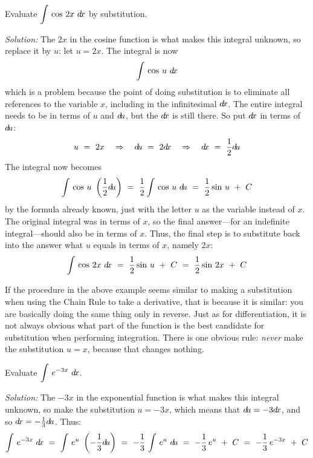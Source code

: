 \begin{exmp}\label{exmp:subst1}
\noindent Evaluate $\displaystyle\int\,\cos\,2x~d\!x$ by substitution.\vspace{1mm}
\par\noindent\emph{Solution:} The $2x$ in the cosine function is what makes this
integral unknown, so replace it by $u$: let $u = 2x$. The integral is now
\[
\int\,\cos\,u~d\!x
\]
which is a problem because the point of doing substitution is to eliminate all
references to the variable $x$, including in the infinitesimal $d\!x$. The entire
integral needs to be in terms of $u$ and $d\!u$, but the $d\!x$ is still there. So
put $d\!x$ in terms of $d\!u$:
\[
u ~=~ 2x \quad\Rightarrow\quad d\!u ~=~ 2 d\!x \quad\Rightarrow\quad d\!x ~=~
\frac{1}{2} d\!u
\]
The integral now becomes
\[
\int\,\cos\,u~ \left(\frac{1}{2}d\!u\right) ~=~
\frac{1}{2} \int\,\cos\,u~d\!u ~=~ \frac{1}{2} \sin\,u ~+~ C
\]
by the formula already known, just with the letter $u$ as the variable instead
of $x$. The original integral was in terms of $x$, so the final answer---for
an indefinite integral---should also be in terms of $x$. Thus, the final step is
to substitute back into the answer what $u$ equals in terms of $x$, namely $2x$:
\[
\int\,\cos\,2x~d\!x ~=~ \frac{1}{2} \sin\,u ~+~ C ~=~ \frac{1}{2} \sin\,2x ~+~ C
\]
\end{exmp}
\divider
\vspace{3mm}

If the procedure in the above example seems similar to making a substitution
when using the Chain Rule to take a derivative, that is because it is similar:
you are basically doing the same thing only in reverse. Just as for
differentiation, it is not always obvious what part of the function is the best
candidate for substitution when performing integration. There is one obvious
rule: \emph{never} make the substitution $u = x$, because that changes nothing.
\newpage
\begin{exmp}\label{exmp:subst2}
\noindent Evaluate $\displaystyle\int\,e^{-3x}~d\!x$.\vspace{1mm}
\par\noindent\emph{Solution:} The $-3x$ in the exponential function is what makes
this integral unknown, so make the substitution $u = -3x$, which means that
$d\!u = -3d\!x$, and so $d\!x = -\frac{1}{3}d\!u$. Thus:
\[
\int\,e^{-3x}~d\!x ~=~ \int\,e^{u}~\left(-\frac{1}{3}d\!u\right)
 ~=~ -\frac{1}{3}\,\int\,e^{u}~d\!u ~=~ -\frac{1}{3}\,e^u ~+~ C ~=~
 -\frac{1}{3}\,e^{-3x} ~+~ C
\]
\end{exmp}
\divider
\vspace{3mm}

